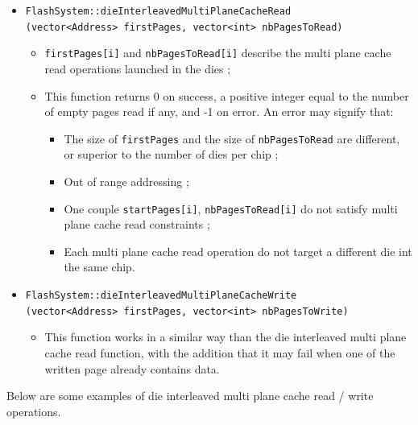 \begin{itemize}
  \item \verb+FlashSystem::dieInterleavedMultiPlaneCacheRead+\\\verb+(vector<Address> firstPages, vector<int> nbPagesToRead)+
  \begin{itemize}
    \item \verb+firstPages[i]+ and \verb+nbPagesToRead[i]+ describe the multi plane cache read operations launched in the dies ;
    \item This function returns 0 on success, a positive integer equal to the number of empty pages read if any, and -1 on error. An error may signify that:
    \begin{itemize}
      \item The size of \verb+firstPages+ and the size of \verb+nbPagesToRead+ are different, or superior to the number of dies per chip ;
      \item Out of range addressing ;
      \item One couple \verb+startPages[i]+, \verb+nbPagesToRead[i]+ do not satisfy multi plane cache read constraints ;
      \item Each multi plane cache read operation do not target a different die int the same chip.
    \end{itemize}
  \end{itemize}
  
  \item \verb+FlashSystem::dieInterleavedMultiPlaneCacheWrite+\\\verb+(vector<Address> firstPages, vector<int> nbPagesToWrite)+
  \begin{itemize}
    \item This function works in a similar way than the die interleaved multi plane cache read function, with the addition that it may fail when one of the written page already contains data.
  \end{itemize}
\end{itemize}

Below are some examples of die interleaved multi plane cache read / write operations.

